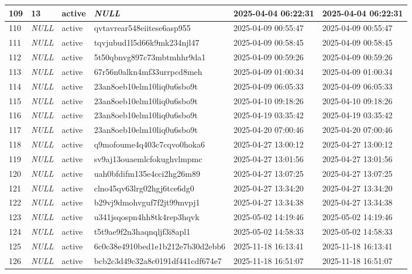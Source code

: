\begin{longtable}{|l|l|l|l|l|l|}
109 & 13 & active & \textit{NULL} & 2025-04-04 06:22:31 & 2025-04-04 06:22:31 \\ \hline 
110 & \textit{NULL} & active & qvtavrear548eiitese6asp955 & 2025-04-09 00:55:47 & 2025-04-09 00:55:47 \\ \hline 
111 & \textit{NULL} & active & tqvjubud1l5d66k9mk234njl47 & 2025-04-09 00:58:45 & 2025-04-09 00:58:45 \\ \hline 
112 & \textit{NULL} & active & 5t50qbnvg897c73mbtmhhr9da1 & 2025-04-09 00:59:26 & 2025-04-09 00:59:26 \\ \hline 
113 & \textit{NULL} & active & 67r56n0alkn4mf33urrpcd8meh & 2025-04-09 01:00:34 & 2025-04-09 01:00:34 \\ \hline 
114 & \textit{NULL} & active & 23an8oeb10elm10liq0u6sbo9t & 2025-04-09 06:05:33 & 2025-04-09 06:05:33 \\ \hline 
115 & \textit{NULL} & active & 23an8oeb10elm10liq0u6sbo9t & 2025-04-10 09:18:26 & 2025-04-10 09:18:26 \\ \hline 
116 & \textit{NULL} & active & 23an8oeb10elm10liq0u6sbo9t & 2025-04-19 03:35:42 & 2025-04-19 03:35:42 \\ \hline 
117 & \textit{NULL} & active & 23an8oeb10elm10liq0u6sbo9t & 2025-04-20 07:00:46 & 2025-04-20 07:00:46 \\ \hline 
118 & \textit{NULL} & active & q9mofoume4q403c7cqvo0hoka6 & 2025-04-27 13:00:12 & 2025-04-27 13:00:12 \\ \hline 
119 & \textit{NULL} & active & sv9aj13ouaemlcfokughvlmpmc & 2025-04-27 13:01:56 & 2025-04-27 13:01:56 \\ \hline 
120 & \textit{NULL} & active & uah0bfdifm135e4cci2hg26m89 & 2025-04-27 13:07:25 & 2025-04-27 13:07:25 \\ \hline 
121 & \textit{NULL} & active & clno45qv63lrg02hgj6tce6dg0 & 2025-04-27 13:34:20 & 2025-04-27 13:34:20 \\ \hline 
122 & \textit{NULL} & active & b29vj9dmohvguf7f2jt99mvpj1 & 2025-04-27 13:34:38 & 2025-04-27 13:34:38 \\ \hline 
123 & \textit{NULL} & active & u341jsqospn4hh8tk4rep3hqvk & 2025-05-02 14:19:46 & 2025-05-02 14:19:46 \\ \hline 
124 & \textit{NULL} & active & t5t9ae9f2n3haqnqljf3i8apl1 & 2025-05-02 14:58:33 & 2025-05-02 14:58:33 \\ \hline 
125 & \textit{NULL} & active & 6c0c38e4910bed1e1b212e7b30d2ebb6 & 2025-11-18 16:13:41 & 2025-11-18 16:13:41 \\ \hline 
126 & \textit{NULL} & active & bcb2c3d49c32a8c0191df441cdf674e7 & 2025-11-18 16:51:07 & 2025-11-18 16:51:07 \\ \hline 

\end{longtable}
